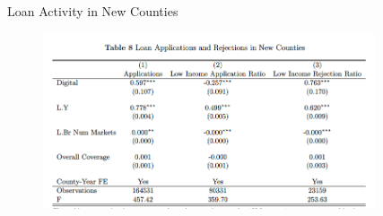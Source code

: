 \documentclass[notes,10pt, aspectratio=169]{beamer}
\newenvironment{wideitemize}{\itemize\addtolength{\itemsep}{10pt}}{\enditemize}
\begin{document}
\begin{frame}{Loan Activity in New Counties}


    \begin{figure}
        \centering
        \includegraphics[width=0.875\textwidth]{imgs/tab8.png}
    \end{figure}
    
\end{frame}





    
    

    
        
\end{document}
